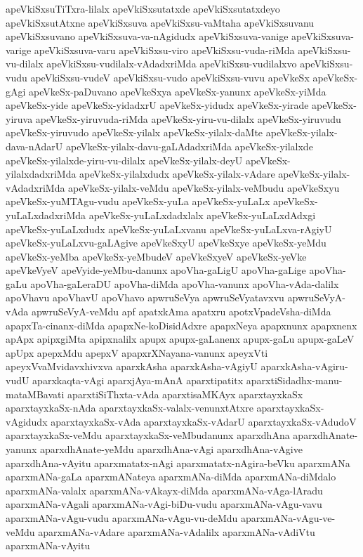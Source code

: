 {apeVkiSxsuTiTxra-lilalx
apeVkiSxsutatxde
apeVkiSxsutatxdeyo
apeVkiSxsutAtxne
apeVkiSxsuva
apeVkiSxsu-vaMtaha
apeVkiSxsuvanu
apeVkiSxsuvano
apeVkiSxsuva-va-nAgidudx
apeVkiSxsuva-vanige
apeVkiSxsuva-varige
apeVkiSxsuva-varu
apeVkiSxsu-viro
apeVkiSxsu-vuda-riMda
apeVkiSxsu-vu-dilalx
apeVkiSxsu-vudilalx-vAdadxriMda
apeVkiSxsu-vudilalxvo
apeVkiSxsu-vudu
apeVkiSxsu-vudeV
apeVkiSxsu-vudo
apeVkiSxsu-vuvu
apeVkeSx
apeVkeSx-gAgi
apeVkeSx-paDuvano
apeVkeSxya
apeVkeSx-yanunx
apeVkeSx-yiMda
apeVkeSx-yide
apeVkeSx-yidadxrU
apeVkeSx-yidudx
apeVkeSx-yirade
apeVkeSx-yiruva
apeVkeSx-yiruvuda-riMda
apeVkeSx-yiru-vu-dilalx
apeVkeSx-yiruvudu
apeVkeSx-yiruvudo
apeVkeSx-yilalx
apeVkeSx-yilalx-daMte
apeVkeSx-yilalx-dava-nAdarU
apeVkeSx-yilalx-davu-gaLAdadxriMda
apeVkeSx-yilalxde
apeVkeSx-yilalxde-yiru-vu-dilalx
apeVkeSx-yilalx-deyU
apeVkeSx-yilalxdadxriMda
apeVkeSx-yilalxdudx
apeVkeSx-yilalx-vAdare
apeVkeSx-yilalx-vAdadxriMda
apeVkeSx-yilalx-veMdu
apeVkeSx-yilalx-veMbudu
apeVkeSxyu
apeVkeSx-yuMTAgu-vudu
apeVkeSx-yuLa
apeVkeSx-yuLaLx
apeVkeSx-yuLaLxdadxriMda
apeVkeSx-yuLaLxdadxlalx
apeVkeSx-yuLaLxdAdxgi
apeVkeSx-yuLaLxdudx
apeVkeSx-yuLaLxvanu
apeVkeSx-yuLaLxva-rAgiyU
apeVkeSx-yuLaLxvu-gaLAgive
apeVkeSxyU
apeVkeSxye
apeVkeSx-yeMdu
apeVkeSx-yeMba
apeVkeSx-yeMbudeV
apeVkeSxyeV
apeVkeSx-yeVke
apeVkeVyeV
apeVyide-yeMbu-danunx
apoVha-gaLigU
apoVha-gaLige
apoVha-gaLu
apoVha-gaLeraDU
apoVha-diMda
apoVha-vanunx
apoVha-vAda-dalilx
apoVhavu
apoVhavU
apoVhavo
apwruSeVya
apwruSeVyatavxvu
apwruSeVyA-vAda
apwruSeVyA-veMdu
apf
apatxkAma
apatxru
apotxVpadeVsha-diMda
apapxTa-cinanx-diMda
apapxNe-koDisidAdxre
apapxNeya
apapxnunx
apapxnenx
apApx
apipxgiMta
apipxnalilx
apupx
apupx-gaLanenx
apupx-gaLu
apupx-gaLeV
apUpx
apepxMdu
apepxV
apapxrXNayana-vanunx
apeyxVti
apeyxVvaMvidavxhivxva
aparxkAsha
aparxkAsha-vAgiyU
aparxkAsha-vAgiru-vudU
aparxkaqta-vAgi
aparxjAya-mAnA
aparxtipatitx
aparxtiSidadhx-manu-mataMBavati
aparxtiSiThxta-vAda
aparxtisaMKAyx
aparxtayxkaSx
aparxtayxkaSx-nAda
aparxtayxkaSx-valalx-venunxtAtxre
aparxtayxkaSx-vAgidudx
aparxtayxkaSx-vAda
aparxtayxkaSx-vAdarU
aparxtayxkaSx-vAdudoV
aparxtayxkaSx-veMdu
aparxtayxkaSx-veMbudanunx
aparxdhAna
aparxdhAnate-yanunx
aparxdhAnate-yeMdu
aparxdhAna-vAgi
aparxdhAna-vAgive
aparxdhAna-vAyitu
aparxmatatx-nAgi
aparxmatatx-nAgira-beVku
aparxmANa
aparxmANa-gaLa
aparxmANateya
aparxmANa-diMda
aparxmANa-diMdalo
aparxmANa-valalx
aparxmANa-vAkayx-diMda
aparxmANa-vAga-lAradu
aparxmANa-vAgali
aparxmANa-vAgi-biDu-vudu
aparxmANa-vAgu-vavu
aparxmANa-vAgu-vudu
aparxmANa-vAgu-vu-deMdu
aparxmANa-vAgu-ve-veMdu
aparxmANa-vAdare
aparxmANa-vAdalilx
aparxmANa-vAdiVtu
aparxmANa-vAyitu
}

